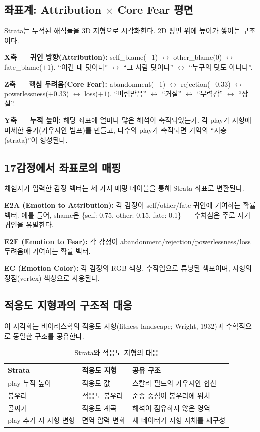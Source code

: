 \documentclass[11pt, a4paper]{article}
\begin{document}
\subsection{좌표계: Attribution $\times$ Core Fear 평면}

Strata는 누적된 해석들을 3D 지형으로 시각화한다. 2D 평면 위에 높이가 쌓이는 구조이다.

\textbf{X축 --- 귀인 방향(Attribution):} self\_blame($-1$) $\leftrightarrow$ other\_blame($0$) $\leftrightarrow$ fate\_blame($+1$). ``이건 내 탓이다'' $\leftrightarrow$ ``그 사람 탓이다'' $\leftrightarrow$ ``누구의 탓도 아니다''.

\textbf{Z축 --- 핵심 두려움(Core Fear):} abandonment($-1$) $\leftrightarrow$ rejection($-0.33$) $\leftrightarrow$ powerlessness($+0.33$) $\leftrightarrow$ loss($+1$). ``버림받음'' $\leftrightarrow$ ``거절'' $\leftrightarrow$ ``무력감'' $\leftrightarrow$ ``상실''.

\textbf{Y축 --- 누적 높이:} 해당 좌표에 얼마나 많은 해석이 축적되었는가. 각 play가 지형에 미세한 융기(가우시안 범프)를 만들고, 다수의 play가 축적되면 기억의 ``지층(strata)''이 형성된다.

\subsection{17감정에서 좌표로의 매핑}

체험자가 입력한 감정 벡터는 세 가지 매핑 테이블을 통해 Strata 좌표로 변환된다.

\textbf{E2A (Emotion to Attribution):} 각 감정이 self/other/fate 귀인에 기여하는 확률 벡터. 예를 들어, shame은 \{self: 0.75, other: 0.15, fate: 0.1\}~--- 수치심은 주로 자기 귀인을 유발한다.

\textbf{E2F (Emotion to Fear):} 각 감정이 abandonment/rejection/powerlessness/loss 두려움에 기여하는 확률 벡터.

\textbf{EC (Emotion Color):} 각 감정의 RGB 색상. 수작업으로 튜닝된 색표이며, 지형의 정점(vertex) 색상으로 사용된다.

\subsection{적응도 지형과의 구조적 대응}

이 시각화는 바이러스학의 적응도 지형(fitness landscape; Wright, 1932\cite{wright1932})과 수학적으로 동일한 구조를 공유한다.

\begin{table}[htbp]
\centering
\small
\begin{tabular}{p{4cm}p{3.5cm}p{5.5cm}}
\toprule
\textbf{Strata} & \textbf{적응도 지형} & \textbf{공유 구조} \\
\midrule
play 누적 높이 & 적응도 값 & 스칼라 필드의 가우시안 합산 \\
봉우리 & 적응도 봉우리 & 준종 중심이 봉우리에 위치 \\
골짜기 & 적응도 계곡 & 해석이 점유하지 않은 영역 \\
play 추가 시 지형 변형 & 면역 압력 변화 & 새 데이터가 지형 자체를 재구성 \\
\bottomrule
\end{tabular}
\caption{Strata와 적응도 지형의 대응}
\label{tab:strata}
\end{table}
\end{document}
